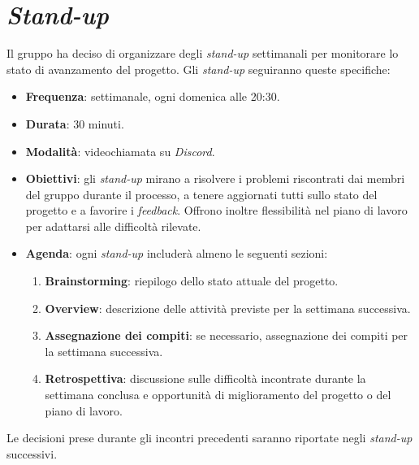 \section{\textit{Stand-up}}

Il gruppo ha deciso di organizzare degli \textit{stand-up} settimanali per
monitorare lo stato di avanzamento del progetto. Gli \textit{stand-up}
seguiranno queste
specifiche:

\begin{itemize}
	\item \textbf{Frequenza}: settimanale, ogni domenica alle 20:30.

	\item \textbf{Durata}: 30 minuti.

	\item \textbf{Modalità}: videochiamata su \textit{Discord}.

	\item \textbf{Obiettivi}: gli \textit{stand-up} mirano a risolvere i
	      problemi riscontrati dai membri del gruppo durante il processo, a tenere
	      aggiornati tutti sullo stato del progetto e a favorire i
	      \textit{feedback}. Offrono inoltre flessibilità nel piano di lavoro per
	      adattarsi alle difficoltà rilevate.

	\item \textbf{Agenda}: ogni \textit{stand-up} includerà almeno le seguenti
	      sezioni:
	      \begin{enumerate}
		      \item \textbf{Brainstorming}: riepilogo dello stato attuale del
		            progetto.

		      \item \textbf{Overview}: descrizione delle attività previste per
		            la settimana successiva.

		      \item \textbf{Assegnazione dei compiti}: se necessario,
		            assegnazione dei compiti per la settimana successiva.

		      \item \textbf{Retrospettiva}: discussione sulle difficoltà
		            incontrate durante la settimana conclusa e opportunità di
		            miglioramento del progetto o del piano di lavoro.
	      \end{enumerate}
\end{itemize}

Le decisioni prese durante gli incontri precedenti saranno riportate negli 
\textit{stand-up} successivi.

